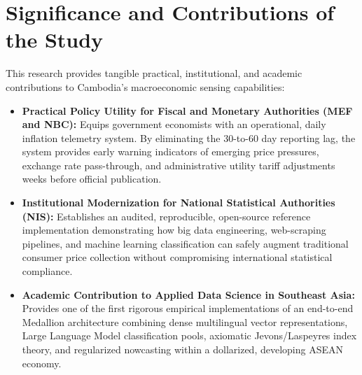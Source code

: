 \section{Significance and Contributions of the Study}
\hs This research provides tangible practical, institutional, and academic contributions to Cambodia's macroeconomic sensing capabilities:
\begin{itemize}
    \item \textbf{Practical Policy Utility for Fiscal and Monetary Authorities (MEF and NBC):} Equips government economists with an operational, daily inflation telemetry system. By eliminating the 30-to-60 day reporting lag, the system provides early warning indicators of emerging price pressures, exchange rate pass-through, and administrative utility tariff adjustments weeks before official publication.
    \item \textbf{Institutional Modernization for National Statistical Authorities (NIS):} Establishes an audited, reproducible, open-source reference implementation demonstrating how big data engineering, web-scraping pipelines, and machine learning classification can safely augment traditional consumer price collection without compromising international statistical compliance.
    \item \textbf{Academic Contribution to Applied Data Science in Southeast Asia:} Provides one of the first rigorous empirical implementations of an end-to-end Medallion architecture combining dense multilingual vector representations, Large Language Model classification pools, axiomatic Jevons/Laspeyres index theory, and regularized nowcasting within a dollarized, developing ASEAN economy.
\end{itemize}

